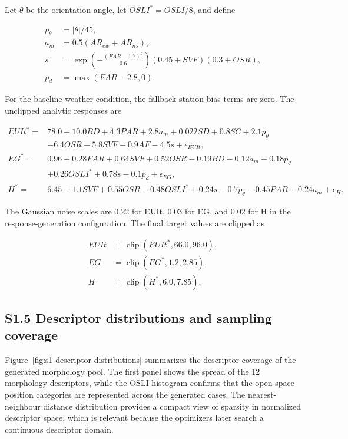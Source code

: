 \documentclass[11pt]{article}
\begin{document}
Let $\theta$ be the orientation angle, let $OSLI^\ast = OSLI/8$, and define

\begin{align}
p_\theta &= |\theta| / 45,\\
a_m &= 0.5(AR_{ew}+AR_{ns}),\\
s &= \exp\left(-\frac{(FAR-1.7)^2}{0.6}\right)(0.45+SVF)(0.3+OSR),\\
p_d &= \max(FAR-2.8,0).
\end{align}

For the baseline weather condition, the fallback station-bias terms are zero. The unclipped analytic responses are

\begin{align}
EUIt^\ast ={}& 78.0 + 10.0BD + 4.3PAR + 2.8a_m + 0.022SD + 0.8SC + 2.1p_\theta \nonumber\\
& - 6.4OSR - 5.8SVF - 0.9AF - 4.5s + \epsilon_{EUIt},\\
EG^\ast ={}& 0.96 + 0.28FAR + 0.64SVF + 0.52OSR - 0.19BD - 0.12a_m - 0.18p_\theta \nonumber\\
& + 0.26OSLI^\ast + 0.78s - 0.1p_d + \epsilon_{EG},\\
H^\ast ={}& 6.45 + 1.1SVF + 0.55OSR + 0.48OSLI^\ast + 0.24s - 0.7p_\theta - 0.45PAR - 0.24a_m + \epsilon_H.
\end{align}

The Gaussian noise scales are 0.22 for EUIt, 0.03 for EG, and 0.02 for H in the response-generation configuration. The final target values are clipped as

\begin{align}
EUIt &= \operatorname{clip}(EUIt^\ast,66.0,96.0),\\
EG &= \operatorname{clip}(EG^\ast,1.2,2.85),\\
H &= \operatorname{clip}(H^\ast,6.0,7.85).
\end{align}

\subsection*{S1.5 Descriptor distributions and sampling coverage}

Figure~\ref{fig:s1-descriptor-distributions} summarizes the descriptor coverage of the generated morphology pool. The first panel shows the spread of the 12 morphology descriptors, while the OSLI histogram confirms that the open-space position categories are represented across the generated cases. The nearest-neighbour distance distribution provides a compact view of sparsity in normalized descriptor space, which is relevant because the optimizers later search a continuous descriptor domain.
\end{document}
